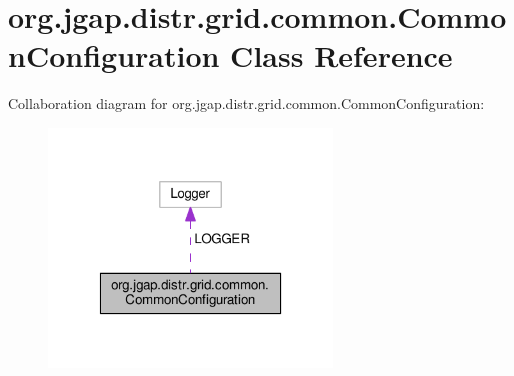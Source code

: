 \hypertarget{classorg_1_1jgap_1_1distr_1_1grid_1_1common_1_1_common_configuration}{\section{org.\-jgap.\-distr.\-grid.\-common.\-Common\-Configuration Class Reference}
\label{classorg_1_1jgap_1_1distr_1_1grid_1_1common_1_1_common_configuration}
}


Collaboration diagram for org.\-jgap.\-distr.\-grid.\-common.\-Common\-Configuration\-:
\nopagebreak
\begin{figure}[H]
\begin{center}
\leavevmode
\includegraphics[width=214pt]{classorg_1_1jgap_1_1distr_1_1grid_1_1common_1_1_common_configuration__coll__graph}
\end{center}
\end{figure}
